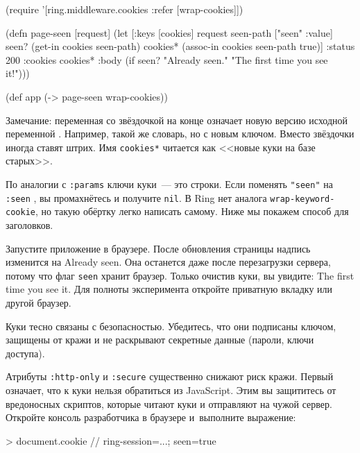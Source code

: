 \else

\begin{english}
  \begin{clojure/lines}
(require '[ring.middleware.cookies
           :refer [wrap-cookies]])

(defn page-seen [request]
  (let [{:keys [cookies]} request
        seen-path ["seen" :value]
        seen? (get-in cookies seen-path)
        cookies* (assoc-in cookies seen-path true)]
    {:status 200
     :cookies cookies*
     :body (if seen?
             "Already seen."
             "The first time you see it!")}))

(def app (-> page-seen
             wrap-cookies))
  \end{clojure/lines}
\end{english}

\fi

Замечание: переменная со звёздочкой на конце означает новую версию исходной
переменной \ifnarrow{}\else{}\fi. Например, такой
же словарь, но с новым ключом. Вместо звёздочки иногда ставят штрих. Имя
\verb|cookies*| читается как <<новые куки на базе старых>>.


По аналогии с \verb|:params| ключи куки~--- это строки. Если поменять
\verb|"seen"| на \verb|:seen| , вы промахнётесь и получите
\verb|nil|. В Ring нет аналога \verb|wrap-keyword-cookie|, но такую обёртку
легко написать самому. Ниже мы покажем способ для заголовков.

Запустите приложение в браузере. После обновления страницы надпись изменится на
Already seen. Она останется даже после перезагрузки сервера, потому что флаг
\verb|seen| хранит браузер. Только очистив куки, вы увидите: The first time you
see it. Для полноты эксперимента откройте приватную вкладку или другой браузер.


Куки тесно связаны с безопасностью. Убедитесь, что они подписаны ключом,
защищены от кражи и не раскрывают секретные данные (пароли, ключи доступа).

Атрибуты \verb|:http-only| и \verb|:secure| существенно снижают риск
кражи. Первый означает, что к куки нельзя обратиться из JavaScript. Этим вы
защититесь от вредоносных скриптов, которые читают куки и отправляют на чужой
сервер. Откройте консоль разработчика в браузере и~выполните выражение:

\begin{english}
  \begin{js}
> document.cookie
// ring-session=...; seen=true
  \end{js}
\end{english}

